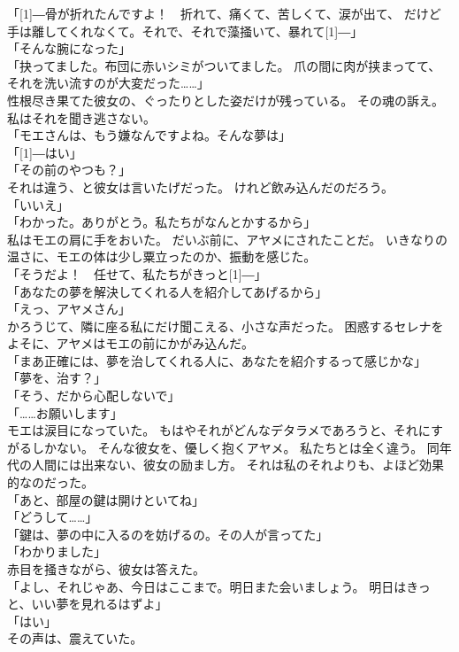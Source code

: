 \documentclass[../IHMain]{subfiles}
\begin{document}
「\scalebox{3}[1]{―}骨が折れたんですよ！　折れて、痛くて、苦しくて、涙が出て、
だけど手は離してくれなくて。それで、それで藻掻いて、暴れて\scalebox{3}[1]{―}」\\
「そんな腕になった」\\
「抉ってました。布団に赤いシミがついてました。
爪の間に肉が挟まってて、それを洗い流すのが大変だった……」\\
性根尽き果てた彼女の、ぐったりとした姿だけが残っている。
その魂の訴え。
私はそれを聞き逃さない。\\
「モエさんは、もう嫌なんですよね。そんな夢は」\\
「\scalebox{3}[1]{―}はい」\\
「その前のやつも？」\\
それは違う、と彼女は言いたげだった。
けれど飲み込んだのだろう。\\
「いいえ」\\
「わかった。ありがとう。私たちがなんとかするから」\\
私はモエの肩に手をおいた。
だいぶ前に、アヤメにされたことだ。
いきなりの温さに、モエの体は少し粟立ったのか、振動を感じた。\\
「そうだよ！　任せて、私たちがきっと\scalebox{3}[1]{―}」\\
「あなたの夢を解決してくれる人を紹介してあげるから」\\
「えっ、アヤメさん」\\
かろうじて、隣に座る私にだけ聞こえる、小さな声だった。
困惑するセレナをよそに、アヤメはモエの前にかがみ込んだ。\\
「まあ正確には、夢を治してくれる人に、あなたを紹介するって感じかな」\\
「夢を、治す？」\\
「そう、だから心配しないで」\\
「……お願いします」\\
モエは涙目になっていた。
もはやそれがどんなデタラメであろうと、それにすがるしかない。
そんな彼女を、優しく抱くアヤメ。
私たちとは全く違う。
同年代の人間には出来ない、彼女の励まし方。
それは私のそれよりも、よほど効果的なのだった。\\
「あと、部屋の鍵は開けといてね」\\
「どうして……」\\
「鍵は、夢の中に入るのを妨げるの。その人が言ってた」\\
「わかりました」\\
赤目を掻きながら、彼女は答えた。\\
「よし、それじゃあ、今日はここまで。明日また会いましょう。
明日はきっと、いい夢を見れるはずよ」\\
「はい」\\
その声は、震えていた。\\
\end{document}
